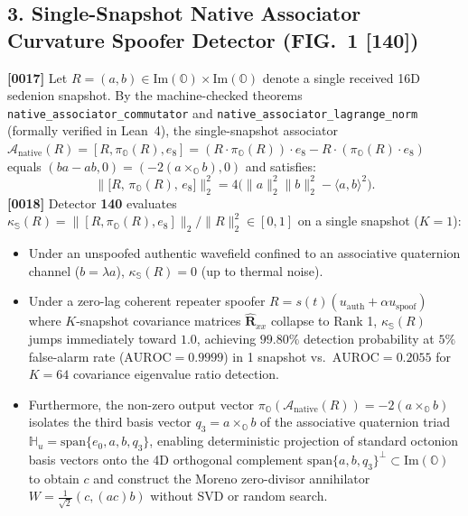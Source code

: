 \documentclass[12pt,letterpaper]{article}
\begin{document}
\subsection*{3. Single-Snapshot Native Associator Curvature Spoofer Detector (FIG.\ 1 [140])}
\textbf{[0017]} Let $R = (a, b) \in \mathrm{Im}(\mathbb{O}) \times \mathrm{Im}(\mathbb{O})$ denote a single received 16D sedenion snapshot. By the machine-checked theorems \texttt{native\_associator\_commutator} and \texttt{native\_associator\_lagrange\_norm} (formally verified in Lean~4), the single-snapshot associator $\mathcal{A}_{\mathrm{native}}(R) = [R, \pi_{\mathbb{O}}(R), e_8] = (R \cdot \pi_{\mathbb{O}}(R)) \cdot e_8 - R \cdot (\pi_{\mathbb{O}}(R) \cdot e_8)$ equals $(ba - ab, 0) = (-2(a \times_{\mathbb{O}} b), 0)$ and satisfies:
\[
    \bigl\|\bigl[R,\, \pi_{\mathbb{O}}(R),\, e_8\bigr]\bigr\|_2^2 = 4\bigl(\|a\|_2^2 \|b\|_2^2 - \langle a, b \rangle^2\bigr).
\]
\textbf{[0018]} Detector \textbf{140} evaluates $\kappa_{\mathbb{S}}(R) = \|[R, \pi_{\mathbb{O}}(R), e_8]\|_2 / \|R\|_2^2 \in [0, 1]$ on a single snapshot ($K=1$):
\begin{itemize}[leftmargin=18pt,itemsep=1pt]
    \item Under an unspoofed authentic wavefield confined to an associative quaternion channel ($b = \lambda a$), $\kappa_{\mathbb{S}}(R) = 0$ (up to thermal noise).
    \item Under a zero-lag coherent repeater spoofer $R = s(t)(u_{\mathrm{auth}} + \alpha u_{\mathrm{spoof}})$ where $K$-snapshot covariance matrices $\hat{\mathbf{R}}_{xx}$ collapse to Rank 1, $\kappa_{\mathbb{S}}(R)$ jumps immediately toward $1.0$, achieving $99.80\%$ detection probability at $5\%$ false-alarm rate ($\mathrm{AUROC} = 0.9999$) in 1 snapshot vs.\ $\mathrm{AUROC} = 0.2055$ for $K=64$ covariance eigenvalue ratio detection.
    \item Furthermore, the non-zero output vector $\pi_{\mathbb{O}}(\mathcal{A}_{\mathrm{native}}(R)) = -2(a \times_{\mathbb{O}} b)$ isolates the third basis vector $q_3 = a \times_{\mathbb{O}} b$ of the associative quaternion triad $\mathbb{H}_u = \mathrm{span}\{e_0, a, b, q_3\}$, enabling deterministic projection of standard octonion basis vectors onto the 4D orthogonal complement $\mathrm{span}\{a, b, q_3\}^\perp \subset \mathrm{Im}(\mathbb{O})$ to obtain $c$ and construct the Moreno zero-divisor annihilator $W = \frac{1}{\sqrt{2}}(c, (ac)b)$ without SVD or random search.
\end{itemize}
\end{document}
